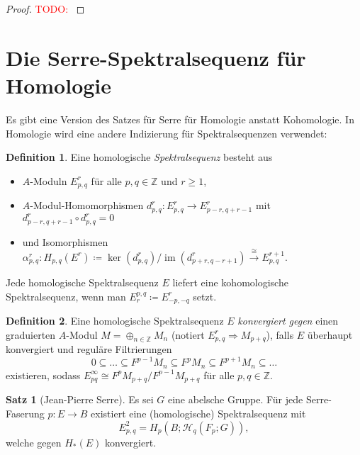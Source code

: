 \documentclass[11pt, a4paper, german]{article}
\theoremstyle{definition}
\newtheorem{satz}{Satz}
\newtheorem{defn}{Definition}
\theoremstyle{remark}
\newcommand{\TODO}[1]{\textcolor{red}{TODO: #1}} %
\newcommand{\Z}{\mathbb{Z}} %
\DeclareMathOperator{\im}{im} %
\newcommand{\LH}{\mathcal{H}} %
\begin{document}
\begin{proof}
  \TODO{}
\end{proof}


\section{Die Serre-Spektralsequenz für Homologie}

Es gibt eine Version des Satzes für Serre für Homologie anstatt Kohomologie.
In Homologie wird eine andere Indizierung für Spektralsequenzen verwendet:

\begin{defn}
  Eine homologische \emph{Spektralsequenz} besteht aus
  \begin{itemize}
    \item $A$-Moduln $E^r_{p,q}$ für alle $p, q \in \Z$ und $r \geq 1$,
    \item $A$-Modul-Homomorphismen $d^r_{p,q} : E^r_{p,q} \to E^r_{p-r,q+r-1}$ mit $d^r_{p-r,q+r-1} \circ d^r_{p,q} = 0$
    \item und Isomorphismen $\alpha^r_{p,q} : H_{p,q}(E^r) \!\coloneqq\! \ker(d ^r_{p,q}) / \im(d^r_{p+r,q-r+1}) \xrightarrow{\cong} E^{r+1}_{p,q}$.
  \end{itemize}
\end{defn}

Jede homologische Spektralsequenz $E$ liefert eine kohomologische Spektralsequenz, wenn man $E_r^{p,q} \coloneqq E^r_{-p,-q}$ setzt.

\begin{defn}
  Eine homologische Spektralsequenz $E$ \emph{konvergiert gegen} einen graduierten $A$-Modul $M = \oplus_{n \in \Z} M_n$ (notiert $E^r_{p,q} \Rightarrow M_{p+q}$), falls $E$ überhaupt konvergiert und reguläre Filtrierungen
  \[ 0 \subseteq \ldots \subseteq F^{p-1} M_n \subseteq F^p M_n \subseteq F^{p+1} M_n \subseteq \ldots \]
  existieren, sodass $E^\infty_{pq} \cong F^p M_{p+q} / F^{p-1} M_{p+q}$ für alle $p, q \in \Z$.
\end{defn}

\begin{satz}[Jean-Pierre Serre]
  Es sei $G$ eine abelsche Gruppe.
  Für jede Serre-Faserung $p : E \to B$ existiert eine (homologische) Spektralsequenz mit
  \[ E^2_{p,q} = H_p(B; \LH_q(F_p; G)), \]
  welche gegen $H_*(E)$ konvergiert.
\end{satz}
\end{document}
